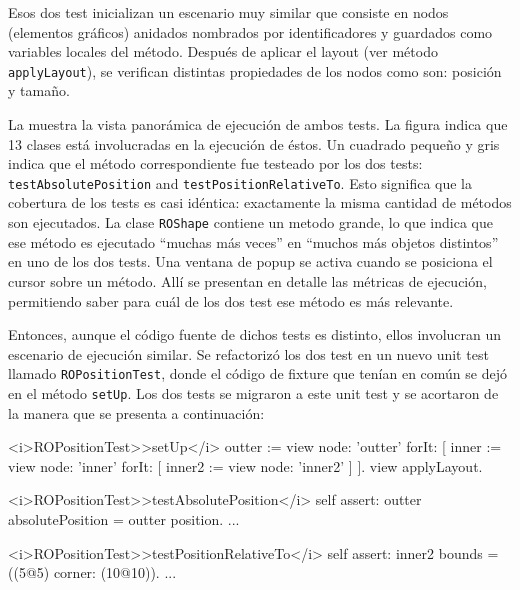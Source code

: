 \par Esos dos test inicializan un escenario muy similar que consiste en nodos (elementos gráficos) anidados nombrados por identificadores y guardados como variables locales del método. Después de aplicar el layout (ver método {\tt applyLayout}), se verifican distintas propiedades de los nodos como son: posición y tamaño.


\par La  muestra la vista panorámica de ejecución de ambos tests. La figura indica que 13 clases está involucradas en la ejecución de éstos. Un cuadrado pequeño y gris indica que el método correspondiente fue testeado por los dos tests: {\tt testAbsolutePosition} and {\tt testPositionRelativeTo}. Esto significa que la cobertura de los tests es casi idéntica: exactamente la misma cantidad de métodos son ejecutados. La clase {\tt ROShape} contiene un metodo grande, lo que indica que ese método es ejecutado  ``muchas más veces'' en ``muchos más objetos distintos'' en uno de los dos tests. Una ventana de popup se activa cuando se posiciona el cursor sobre un método. Allí se presentan en detalle las métricas de ejecución, permitiendo saber para cuál de los dos test ese método es más relevante.


\par Entonces, aunque el código fuente de dichos tests es distinto, ellos involucran un escenario de ejecución similar. Se refactorizó los dos test en un nuevo unit test llamado {\tt ROPositionTest}, donde el código de fixture que tenían en común se dejó en el método {\tt setUp}. Los dos tests se migraron a este unit test y se acortaron de la manera que se presenta a continuación:


\begin{codeWithLineNumbers}
<i>ROPositionTest>>setUp</i>
	outter := view node: 'outter' forIt: [
		inner := view node: 'inner' forIt: [
			inner2 := view node: 'inner2'
		]
	].
	view applyLayout.	
	
<i>ROPositionTest>>testAbsolutePosition</i>
	self assert: outter absolutePosition = outter position.
	...
		
<i>ROPositionTest>>testPositionRelativeTo</i>
	self assert: inner2 bounds = ((5@5) corner: (10@10)).
	...
\end{codeWithLineNumbers}

